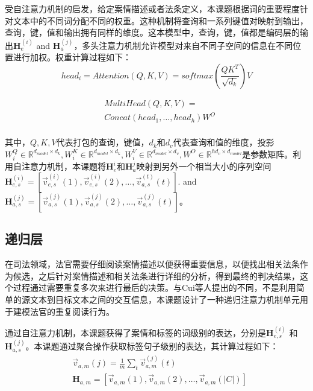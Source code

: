 受自注意力机制\cite{VaswaniSPUJGKP17}的启发，给定案情描述或者法条定义，本课题根据词的重要程度针对文本中的不同词分配不同的权重。这种机制将查询和一系列键值对映射到输出，查询，键，值和输出拥有同样的维度。这本模型中，查询，键，值都是编码层的输出$\textbf{H}_e^{(i)}$ and $\textbf{H}_a^{(j)}$，多头注意力机制允许模型对来自不同子空间的信息在不同位置进行加权。权重计算过程如下：
\begin{equation}\label{eq:self_attention}
    head_i = Attention(Q,K,V) = softmax(\frac{QK^{T}}{\sqrt{d_k}})V
\end{equation}

\begin{equation}\label{eq:multi_head_attention}
    \begin{aligned}
        &MultiHead(Q,K,V) = \\
        &Concat(head_1,\dots,head_h)W^{O} \\            
    \end{aligned}
\end{equation}

其中，$Q,K,V$代表打包的查询，键值，$d_k$和$d_v$代表查询和值的维度，投影$W_i^Q \in \mathbb{R}^{d_{model} \times d_k}, W_i^K 
\in \mathbb{R}^{d_{model} \times d_k},W_i^V \in \mathbb{R}^{d_{model} \times d_v}, W^O \in \mathbb{R}^{hd_v \times d_{model}}$是参数矩阵。利用自注意力机制，本课题将$\textbf{H}_e^i$和$\textbf{H}_a^j$映射到另外一个相当大小的序列空间 $\textbf{H}_{e,s}^{(i)} = [\vec{v}_{e,s}^{(i)}(1), \vec{v}_{e,s}^{(i)}(2), \dots, \vec{v}_{a,s}^{(t)}(t)]$. and $\textbf{H}_{a,s}^{(j)}=[\vec{v}_{a,s}^{(j)}(1), \vec{v}_{a,s}^{(j)}(2), \dots, \vec{v}_{a,s}^{(j)}(t)]$。
\subsection{递归层}
在司法领域，法官需要仔细阅读案情描述以便获得重要信息，以便找出相关法条作为候选，之后针对案情描述和相关法条进行详细的分析，得到最终的判决结果，这个过程通过需要重复多次来进行最后的决策。与Cui等人\cite{CuiCWWLH17}提出的不同，不是利用简单的源文本到目标文本之间的交互信息，本课题设计了一种递归注意力机制单元用于建模法官的重复阅读行为。

通过自注意力机制，本课题获得了案情和标签的词级别的表达，分别是$\textbf{H}_{e,s}^{(i)}$ 和 $\textbf{H}_{a,s}^{(j)}$。本课题通过聚合操作获取标签句子级别的表达，其计算过程如下：
\begin{equation}\label{eq:label vector}
    \begin{aligned}
        & \vec{v}_{a,m}(j)=\frac{1}{m}\sum\limits_{t}\vec{v}_{a,m}^{(j)}(t) \\
        & \textbf{H}_{a,m} = [\vec{v}_{a,m}(1), \vec{v}_{a,m}(2), \dots, \vec{v}_{a,m}(|C|)] \\
    \end{aligned}
\end{equation}

